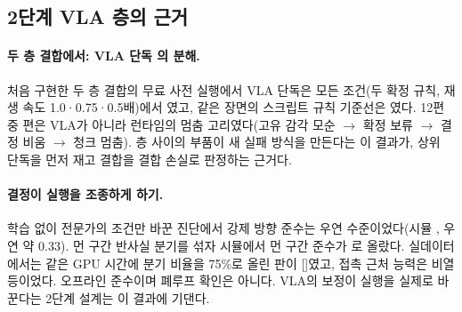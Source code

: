 \subsection{2단계 VLA 층의 근거}
\label{sec:evidence_stage2}
\paragraph{두 층 결합에서: VLA 단독 의 분해.} 처음 구현한 두 층 결합의 무료 사전 실행에서 VLA 단독은 모든 조건(두 확정 규칙, 재생 속도 1.0·0.75·0.5배)에서 였고, 같은 장면의 스크립트 규칙 기준선은 였다. 12편 중 편은 VLA가 아니라 런타임의 멈춤 고리였다(고유 감각 모순 $\rightarrow$ 확정 보류 $\rightarrow$ 결정 비움 $\rightarrow$ 청크 멈춤). 층 사이의 부품이 새 실패 방식을 만든다는 이 결과가, 상위 단독을 먼저 재고 결합을 결합 손실로 판정하는 근거다.

\paragraph{결정이 실행을 조종하게 하기.} 학습 없이 전문가의 조건만 바꾼 진단에서 강제 방향 준수는 우연 수준이었다(시뮬 , 우연 약 0.33). 먼 구간 반사실 분기를 섞자 시뮬에서 먼 구간 준수가 로 올랐다. 실데이터에서는 같은 GPU 시간에 분기 비율을 75\%로 올린 판이  []였고, 접촉 근처 능력은 비열등이었다. 오프라인 준수이며 폐루프 확인은 아니다. VLA의 보정이 실행을 실제로 바꾼다는 2단계 설계는 이 결과에 기댄다.
